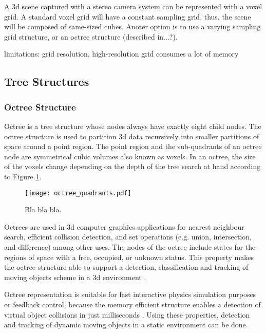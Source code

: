 \documentclass[12pt,a4paper,oneside,pdftex]{report}
\begin{document}
A 3d scene captured with a stereo camera system can be represented with a voxel grid. A standard voxel grid will have a constant sampling grid, thus, the scene will be composed of same-sized cubes. Anoter option is to use a varying sampling grid structure, or an octree structure (described in...?).

limitations: grid resolution, high-resolution grid consumes a lot of memory

\subsection{Tree Structures}
\label{subsection:tree_structures}

\subsubsection{Octree Structure}

Octree is a tree structure whose nodes always have exactly eight child nodes. The octree structure is used to partition 3d data recursively into smaller partitions of space around a point region. The point region and the sub-quadrants of an octree node are symmetrical cubic volumes also known as voxels. In an octree, the size of the voxels change depending on the depth of the tree search at hand according to Figure \ref{fig:octree_quadrants}.

\begin{figure}[ht]
  \begin{center}
    \texttt{[image: octree\_quadrants.pdf]}
    \caption{Bla bla bla.}
    \label{fig:octree_quadrants}
  \end{center}
\end{figure}

Octrees are used in 3d computer graphics applications for nearest neighbour search, efficient collision detection, and set operations (e.g. union, intersection, and difference) among other uses. The nodes of the octree include states for the regions of space with a free, occupied, or unknown status. This property makes the octree structure able to support a detection, classification and tracking of moving objects scheme in a 3d environment \citep{Azim12, Ouyang12}.

Octree representation is suitable for fast interactive physics simulation purposes or feedback control, because the memory efficient structure enables a detection of virtual object collisions in just milliseconds \citep{Noborio99}. Using these properties, detection and tracking of dynamic moving objects in a static environment can be done.
\end{document}
